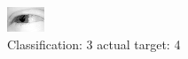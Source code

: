 \begin{figure}[h!]
\begin{center}
\includegraphics[width=0.60\columnwidth]{figures/ID2448_class_3_target_4.png}
\end{center}
\caption{ Classification: 3 actual target: 4}
\label{fig:ID2448_class_3_target_4}
\end{figure}
